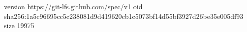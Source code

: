 version https://git-lfs.github.com/spec/v1
oid sha256:1a5c96695cc5c238081d9d419620cb1c5073bf14d55bf3927d26be35e005df93
size 19975

